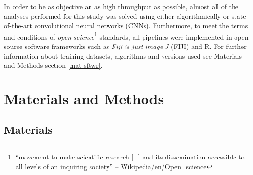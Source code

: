 \documentclass[11pt,singlespacinge,twoside]{reedthesis} %
\begin{document}
In order to be as objective an as high throughput as possible, almost all of the analyses performed for this study was solved using either algorithmically or state-of-the-art convolutional neural networks (CNNs). Furthermore, to meet the terms and conditions of \emph{open science}\footnote{``movement to make scientific research {[}\ldots{}{]} and its dissemination accessible to all levels of an inquiring society'' -- Wikipedia/en/Open\_science} standards, all pipelines were implemented in open source software frameworks such as \emph{Fiji is just image J} (FIJI) and R. For further information about training datasets, algorithms and versions used see Materials and Methods section \ref{mat-sftwr}.

\hypertarget{mat-met}{%
\chapter{Materials and Methods}\label{mat-met}}

\hypertarget{mat}{%
\section{Materials}\label{mat}}
\end{document}
